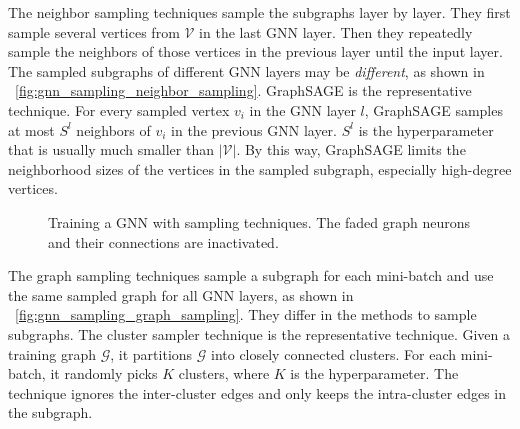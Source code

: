 The neighbor sampling techniques \cite{hamilton2017_graphsage, ying2018_pinsage, chen2018_fastgcn, chen2018_sgcn, huang2018_adap} sample the subgraphs layer by layer.
They first sample several vertices from $\mathcal{V}$ in the last GNN layer.
Then they repeatedly sample the neighbors of those vertices in the previous layer until the input layer.
The sampled subgraphs of different GNN layers may be \emph{different}, as shown in \figurename~\ref{fig:gnn_sampling_neighbor_sampling}.
GraphSAGE \cite{hamilton2017_graphsage} is the representative technique.
For every sampled vertex $v_i$ in the GNN layer $l$, GraphSAGE samples at most $S^l$ neighbors of $v_i$ in the previous GNN layer.
$S^l$ is the hyperparameter that is usually much smaller than $|\mathcal{V}|$.
By this way, GraphSAGE limits the neighborhood sizes of the vertices in the sampled subgraph, especially high-degree vertices.

\begin{figure}
	\centering
	\caption{Training a GNN with sampling techniques. The faded graph neurons and their connections are inactivated.}
	\label{fig:gnn_sampling}
\end{figure}

The graph sampling techniques \cite{zeng2018_aesg, chiang2019_cluster_gcn, zeng2020_graphsaint} sample a subgraph for each mini-batch and use the same sampled graph for all GNN layers, as shown in \figurename~\ref{fig:gnn_sampling_graph_sampling}.
They differ in the methods to sample subgraphs.
The cluster sampler technique \cite{chiang2019_cluster_gcn} is the representative technique.
Given a training graph $\mathcal{G}$, it partitions $\mathcal{G}$ into closely connected clusters.
For each mini-batch, it randomly picks $K$ clusters, where $K$ is the hyperparameter.
The technique ignores the inter-cluster edges and only keeps the intra-cluster edges in the subgraph.

